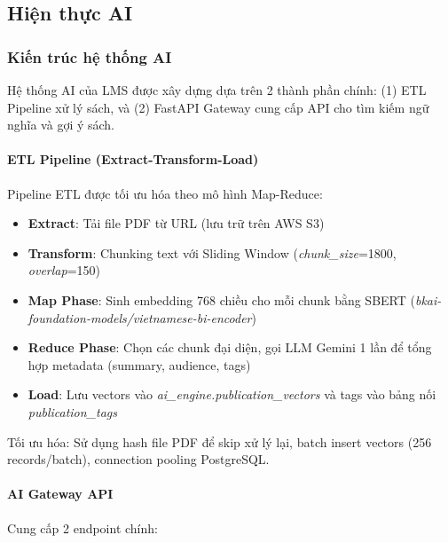 \subsection{Hiện thực AI}

\subsubsection{Kiến trúc hệ thống AI}

Hệ thống AI của LMS được xây dựng dựa trên 2 thành phần chính: (1) ETL Pipeline xử lý sách, và (2) FastAPI Gateway cung cấp API cho tìm kiếm ngữ nghĩa và gợi ý sách.

\paragraph{ETL Pipeline (Extract-Transform-Load)}

Pipeline ETL được tối ưu hóa theo mô hình Map-Reduce:

\begin{itemize}
    \item \textbf{Extract}: Tải file PDF từ URL (lưu trữ trên AWS S3)
    \item \textbf{Transform}: Chunking text với Sliding Window (\textit{chunk\_size}=1800, \textit{overlap}=150)
    \item \textbf{Map Phase}: Sinh embedding 768 chiều cho mỗi chunk bằng SBERT (\textit{bkai-foundation-models/vietnamese-bi-encoder})
    \item \textbf{Reduce Phase}: Chọn các chunk đại diện, gọi LLM Gemini 1 lần để tổng hợp metadata (summary, audience, tags)
    \item \textbf{Load}: Lưu vectors vào \textit{ai\_engine.publication\_vectors} và tags vào bảng nối \textit{publication\_tags}
\end{itemize}

Tối ưu hóa: Sử dụng hash file PDF để skip xử lý lại, batch insert vectors (256 records/batch), connection pooling PostgreSQL.

\paragraph{AI Gateway API}

Cung cấp 2 endpoint chính:


